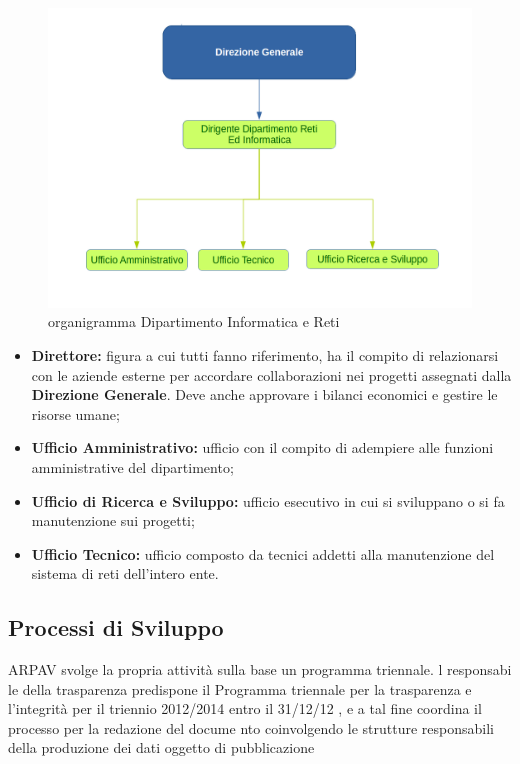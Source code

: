 \begin{figure}[htbp]
	\centering
	\includegraphics[scale=0.4]{./capitoli/capitolo1/img/organigrammaDip}
	\caption{organigramma Dipartimento Informatica e Reti}
\end{figure}

\begin{itemize}

	\item \textbf{Direttore:} figura a cui tutti fanno riferimento, ha il compito di relazionarsi con le aziende esterne per accordare collaborazioni nei progetti assegnati dalla \textbf{Direzione Generale}. Deve anche approvare i bilanci economici e gestire le risorse umane;
	\item \textbf{Ufficio Amministrativo:} ufficio con il compito di adempiere alle funzioni amministrative del dipartimento;
	\item \textbf{Ufficio di Ricerca e Sviluppo:} ufficio esecutivo in cui si sviluppano o si fa manutenzione sui progetti;
	\item \textbf{Ufficio Tecnico:} ufficio composto da tecnici addetti alla manutenzione del sistema di reti dell'intero ente.
	
\end{itemize}
\subsection{Processi di Sviluppo}

ARPAV svolge la propria attività sulla base un programma triennale. l responsabi
le della trasparenza predispone
il Programma triennale per la trasparenza e l’integrità per il
triennio 2012/2014
entro il 31/12/12
, e a tal fine
coordina il processo per la redazione del docume
nto
coinvolgendo le strutture responsabili della produzione dei dati oggetto di pubblicazione

